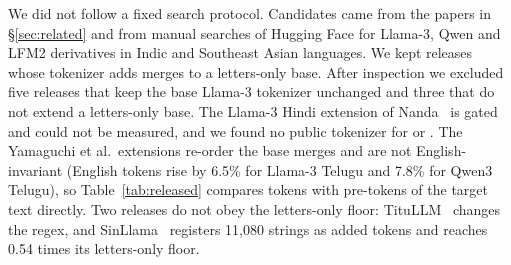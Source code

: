 We did not follow a fixed search protocol. Candidates came from the papers in \S\ref{sec:related} and from manual searches of Hugging Face for Llama-3, Qwen and LFM2 derivatives in Indic and Southeast Asian languages. We kept releases whose tokenizer adds merges to a letters-only base. After inspection we excluded five releases that keep the base Llama-3 tokenizer unchanged and three that do not extend a letters-only base. The Llama-3 Hindi extension of Nanda~\citep{choudhury2025nanda} is gated and could not be measured, and we found no public tokenizer for \citet{nag2024efficientcpt} or \citet{purason-etal-2026-teaching}. The Yamaguchi et al.\ extensions re-order the base merges and are not English-invariant (English tokens rise by 6.5\% for Llama-3 Telugu and 7.8\% for Qwen3 Telugu), so Table~\ref{tab:released} compares tokens with pre-tokens of the target text directly. Two releases do not obey the letters-only floor: TituLLM~\citep{nahin-etal-2025-titullms} changes the regex, and SinLlama~\citep{aravinda2025sinllama} registers 11{,}080 strings as added tokens and reaches 0.54 times its letters-only floor.

